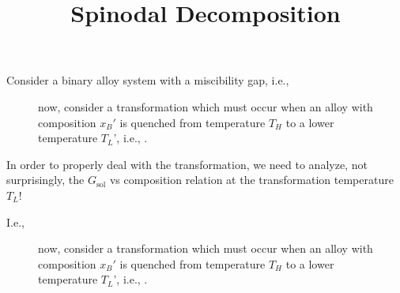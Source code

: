 \documentclass[12pt]{article}
\title{Spinodal Decomposition}
\author{}
\date{}
\begin{document}
\maketitle

Consider a binary alloy system with a miscibility gap,
i.e.,
\begin{figure}[h]
	\begin{minipage}[l]{4cm}
		
	\end{minipage}%
	\hfill
	\begin{minipage}[r]{\textwidth-4cm}
		now, consider a transformation which must occur when an alloy
		with composition $x_B'$ is quenched from temperature $T_H$
		to a lower temperature $T_L$', i.e.,
		.
	\end{minipage}
\end{figure}

In order to properly deal with the transformation, we need to analyze,
not surprisingly, the $G_{\text{sol}}$ vs composition relation at the
transformation temperature $T_L$!

I.e.,
\begin{figure}[h]
  \begin{minipage}[l]{4cm}
    
  \end{minipage}%
  \hfill
  \begin{minipage}[r]{\textwidth-4cm}
    now, consider a transformation which must occur when an alloy
    with composition $x_B'$ is quenched from temperature $T_H$
    to a lower temperature $T_L$', i.e.,
    .
  \end{minipage}
\end{figure}
\end{document}
